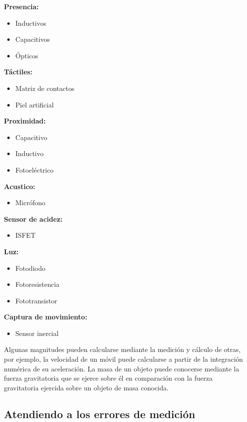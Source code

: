 \textbf{Presencia:}
\begin{itemize}
  \item     Inductivos
  \item     Capacitivos
  \item     Ópticos
\end{itemize}

\textbf{Táctiles:}
\begin{itemize}
  \item     Matriz de contactos
  \item     Piel artificial
\end{itemize}

\textbf{Proximidad:}
\begin{itemize}
  \item     Capacitivo
  \item     Inductivo
  \item     Fotoeléctrico
\end{itemize}

\textbf{Acustico:}
\begin{itemize}
  \item     Micrófono
\end{itemize}

\textbf{Sensor de acidez:}
\begin{itemize}
  \item     ISFET
\end{itemize}

\textbf{Luz:}
\begin{itemize}
  \item     Fotodiodo
  \item     Fotoresistencia
  \item     Fototransistor
\end{itemize}

\textbf{Captura de movimiento:}
\begin{itemize}
  \item     Sensor inercial
\end{itemize}

Algunas magnitudes pueden calcularse mediante la medición y cálculo de otras, por ejemplo, la velocidad de un móvil puede calcularse a partir de la integración numérica de su 
aceleración. La masa de un objeto puede conocerse mediante la fuerza gravitatoria que se ejerce sobre él en comparación con la fuerza gravitatoria ejercida sobre un objeto de 
masa conocida. \\

\subsection{Atendiendo a los errores de medición}

